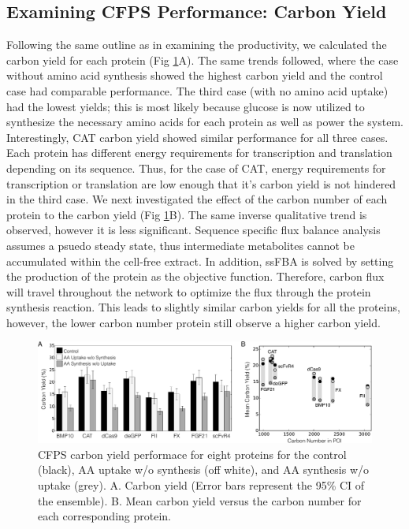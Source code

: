 \documentclass[journal=asbcd6,manuscript=article]{achemso}
\begin{document}
\subsection{Examining CFPS Performance: Carbon Yield}
Following the same outline as in examining the productivity, we calculated the carbon yield for each protein (Fig \ref{fig:Yield_POI}A). 
The same trends followed, where the case without amino acid synthesis showed the highest carbon yield and the control case had comparable performance. 
The third case (with no amino acid uptake) had the lowest yields; this is most likely because glucose is now utilized to synthesize the necessary amino acids for each protein as well as power the system. 
Interestingly, CAT carbon yield showed similar performance for all three cases. 
Each protein has different energy requirements for transcription and translation depending on its sequence.
Thus, for the case of CAT, energy requirements for transcription or translation are low enough that it's carbon yield is not hindered in the third case.
We next investigated the effect of the carbon number of each protein to the carbon yield (Fig \ref{fig:Yield_POI}B). 
The same inverse qualitative trend is observed, however it is less significant. 
Sequence specific flux balance analysis assumes a psuedo steady state, thus intermediate metabolites cannot be accumulated within the cell-free extract.
In addition, ssFBA is solved by setting the production of the protein as the objective function.
Therefore, carbon flux will travel throughout the network to optimize the flux through the protein synthesis reaction. 
This leads to slightly similar carbon yields for all the proteins, however, the lower carbon number protein still observe a higher carbon yield.  
\begin{figure}[t!]
\centering
\includegraphics[width=1.00\textwidth]{./Figures/Yield_POI.pdf}
\caption{CFPS carbon yield performace for eight proteins for the control (black), AA uptake w/o synthesis (off white), and AA synthesis w/o uptake (grey). A. Carbon yield (Error bars represent the 95\% CI of the ensemble). B. Mean carbon yield versus the carbon number for each corresponding protein.}
\label{fig:Yield_POI}
\end{figure}
\end{document}
